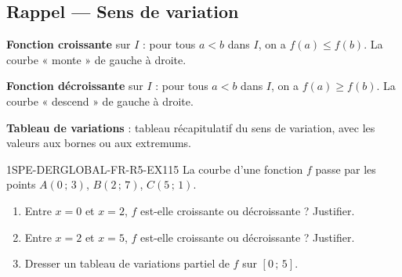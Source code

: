 

\subsection*{Rappel — Sens de variation}

\textbf{Fonction croissante} sur $I$ : pour tous $a < b$ dans $I$, on a $f(a) \leqslant f(b)$. La courbe « monte » de gauche à droite.

\textbf{Fonction décroissante} sur $I$ : pour tous $a < b$ dans $I$, on a $f(a) \geqslant f(b)$. La courbe « descend » de gauche à droite.

\textbf{Tableau de variations} : tableau récapitulatif du sens de variation, avec les valeurs aux bornes ou aux extremums.


\begin{exercice}{1SPE-DERGLOBAL-FR-R5-EX1}{1}{5}
La courbe d'une fonction $f$ passe par les points $A(0\,;\,3)$, $B(2\,;\,7)$, $C(5\,;\,1)$.
\begin{enumerate}
  \item Entre $x = 0$ et $x = 2$, $f$ est-elle croissante ou décroissante ? Justifier.
  \item Entre $x = 2$ et $x = 5$, $f$ est-elle croissante ou décroissante ? Justifier.
  \item Dresser un tableau de variations partiel de $f$ sur $[0\,;\,5]$.
\end{enumerate}
\end{exercice}


